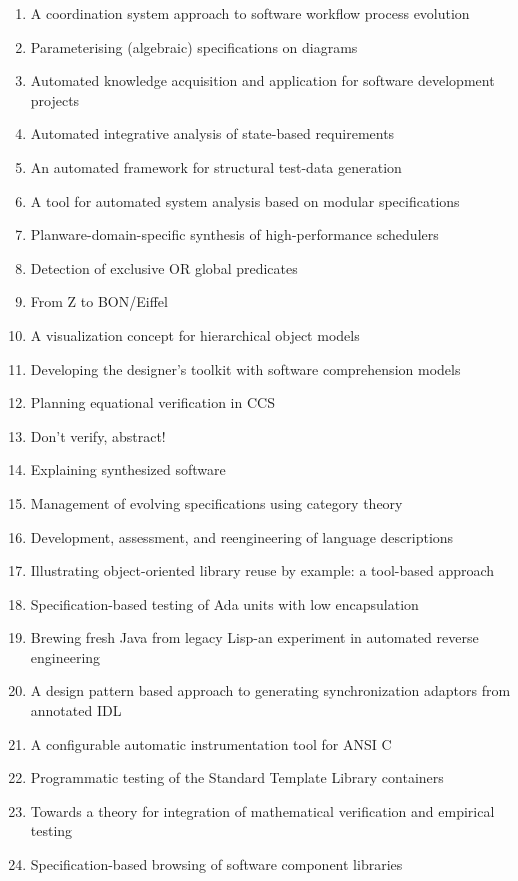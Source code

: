 \begin{enumerate}[itemsep=-1ex]
  \item A coordination system approach to software workflow process evolution
  \item Parameterising (algebraic) specifications on diagrams
  \item Automated knowledge acquisition and application for software development projects
  \item Automated integrative analysis of state-based requirements
  \item An automated framework for structural test-data generation
  \item A tool for automated system analysis based on modular specifications
  \item Planware-domain-specific synthesis of high-performance schedulers
  \item Detection of exclusive OR global predicates
  \item From Z to BON/Eiffel
  \item A visualization concept for hierarchical object models
  \item Developing the designer's toolkit with software comprehension models
  \item Planning equational verification in CCS
  \item Don't verify, abstract!
  \item Explaining synthesized software
  \item Management of evolving specifications using category theory
  \item Development, assessment, and reengineering of language descriptions
  \item Illustrating object-oriented library reuse by example: a tool-based approach
  \item Specification-based testing of Ada units with low encapsulation
  \item Brewing fresh Java from legacy Lisp-an experiment in automated reverse engineering
  \item A design pattern based approach to generating synchronization adaptors from annotated IDL
  \item A configurable automatic instrumentation tool for ANSI C
  \item Programmatic testing of the Standard Template Library containers
  \item Towards a theory for integration of mathematical verification and empirical testing
  \item Specification-based browsing of software component libraries 
\end{enumerate}


